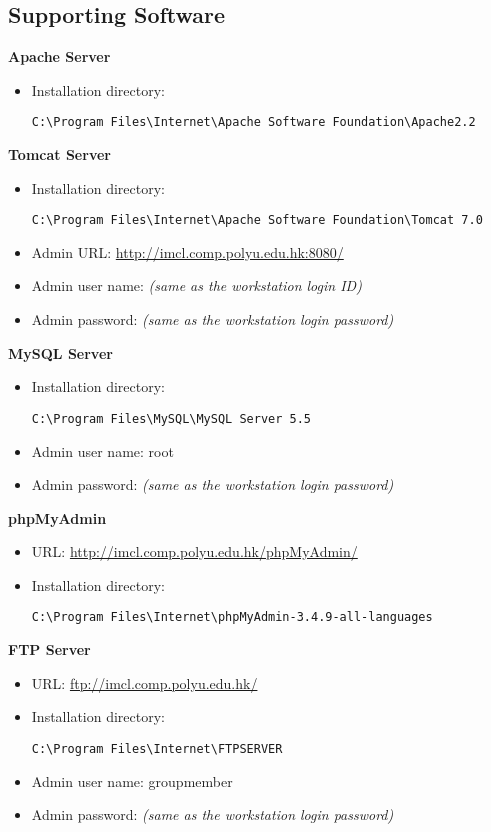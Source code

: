 \subsection{Supporting Software}
\textbf{Apache Server}
\begin{itemize}
\item Installation directory: \begin{verbatim}C:\Program Files\Internet\Apache Software Foundation\Apache2.2\end{verbatim}
\end{itemize}
\textbf{Tomcat Server}
\begin{itemize}
\item Installation directory: \begin{verbatim}C:\Program Files\Internet\Apache Software Foundation\Tomcat 7.0\end{verbatim}
\item Admin URL: \url{http://imcl.comp.polyu.edu.hk:8080/}
\item Admin user name: \emph{(same as the workstation login ID)}
\item Admin password: \emph{(same as the workstation login password)}
\end{itemize}
\textbf{MySQL Server}
\begin{itemize}
\item Installation directory: \begin{verbatim}C:\Program Files\MySQL\MySQL Server 5.5\end{verbatim}
\item Admin user name: root
\item Admin password: \emph{(same as the workstation login password)}
\end{itemize}
\textbf{phpMyAdmin}
\begin{itemize}
\item URL: \url{http://imcl.comp.polyu.edu.hk/phpMyAdmin/}
\item Installation directory: \begin{verbatim}C:\Program Files\Internet\phpMyAdmin-3.4.9-all-languages\end{verbatim}
\end{itemize}
\textbf{FTP Server}
\begin{itemize}
\item URL: \url{ftp://imcl.comp.polyu.edu.hk/}
\item Installation directory: \begin{verbatim}C:\Program Files\Internet\FTPSERVER\end{verbatim}
\item Admin user name: groupmember
\item Admin password: \emph{(same as the workstation login password)}
\end{itemize}
